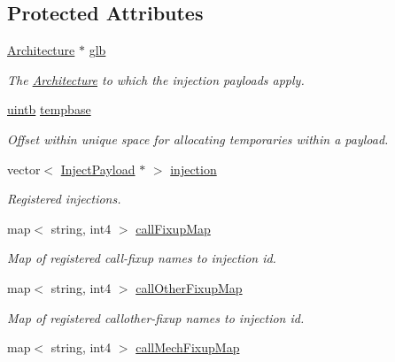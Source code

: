 \subsection*{Protected Attributes}
\begin{DoxyCompactItemize}
\item 
\mbox{\hyperlink{class_architecture}{Architecture}} $\ast$ \mbox{\hyperlink{class_pcode_inject_library_a132ab1eb8c759a0cfaa78ad1b25f5b8b}{glb}}
\begin{DoxyCompactList}\small\item\em The \mbox{\hyperlink{class_architecture}{Architecture}} to which the injection payloads apply. \end{DoxyCompactList}\item 
\mbox{\hyperlink{types_8h_a2db313c5d32a12b01d26ac9b3bca178f}{uintb}} \mbox{\hyperlink{class_pcode_inject_library_a52091b5829f5085157ec948cd1eef60c}{tempbase}}
\begin{DoxyCompactList}\small\item\em Offset within {\itshape unique} space for allocating temporaries within a payload. \end{DoxyCompactList}\item 
vector$<$ \mbox{\hyperlink{class_inject_payload}{Inject\+Payload}} $\ast$ $>$ \mbox{\hyperlink{class_pcode_inject_library_ab56d641b00776993e15d0349627a8672}{injection}}
\begin{DoxyCompactList}\small\item\em Registered injections. \end{DoxyCompactList}\item 
map$<$ string, int4 $>$ \mbox{\hyperlink{class_pcode_inject_library_a8ee8b14330c4a1a686bcecd84dc0c2e9}{call\+Fixup\+Map}}
\begin{DoxyCompactList}\small\item\em Map of registered call-\/fixup names to injection id. \end{DoxyCompactList}\item 
map$<$ string, int4 $>$ \mbox{\hyperlink{class_pcode_inject_library_a7bc738dd5cedca8a28dad33fac7629b6}{call\+Other\+Fixup\+Map}}
\begin{DoxyCompactList}\small\item\em Map of registered callother-\/fixup names to injection id. \end{DoxyCompactList}\item 
map$<$ string, int4 $>$ \mbox{\hyperlink{class_pcode_inject_library_a5e60d3c9319a18387281404cb92503e3}{call\+Mech\+Fixup\+Map}}

\end{DoxyCompactItemize}
